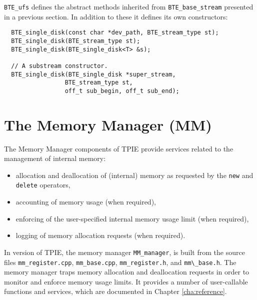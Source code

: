\verb|BTE_ufs| defines the abstract methods inherited from
\verb|BTE_base_stream| presented in a previous section. In addition to
these it defines its own constructors:
\begin{verbatim}
  BTE_single_disk(const char *dev_path, BTE_stream_type st); 
  BTE_single_disk(BTE_stream_type st); 
  BTE_single_disk(BTE_single_disk<T> &s); 
  
  // A substream constructor.
  BTE_single_disk(BTE_single_disk *super_stream,
                 BTE_stream_type st,
                 off_t sub_begin, off_t sub_end);
\end{verbatim}



\section{The Memory Manager (MM)}
\label{sec:ref-mm}

The Memory Manager components of TPIE provide services related to
the management of internal memory:
\begin{itemize}
\item allocation and deallocation of (internal)
memory as requested by the \verb|new| and \verb|delete| operators,
\item accounting of memory usage (when required),
\item enforcing of the user-specified internal memory usage
limit (when required),
\item logging of memory allocation requests (when required).
\end{itemize}

In version \version of TPIE, the memory manager
\verb|MM_manager|, is built from the source files
\verb|mm_register.cpp|, \verb|mm_base.cpp|,
\verb|mm_register.h|, and \verb|mm\_base.h|.  The memory
manager traps memory allocation and deallocation requests in
order to monitor and enforce memory usage limits. It
provides a number of user-callable functions and services,
which are documented in Chapter \ref{cha:reference}.

\tobewritten




